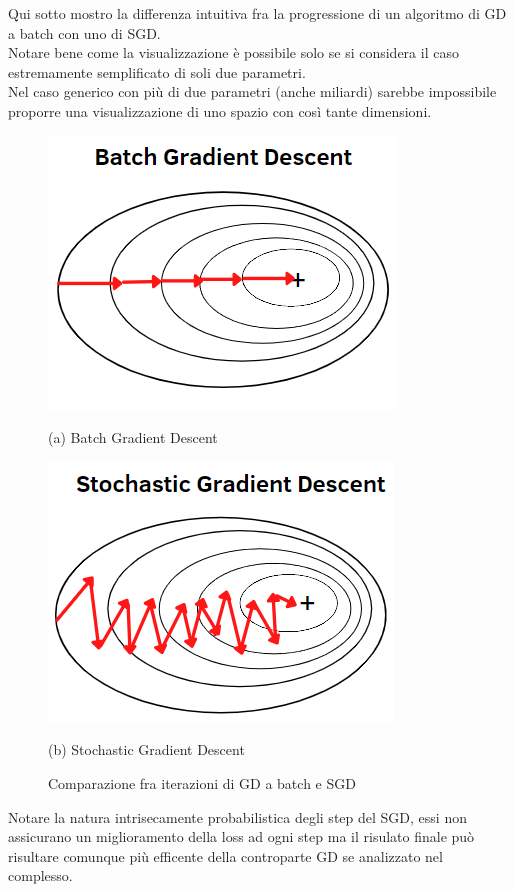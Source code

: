 \documentclass[12pt,a4paper,openright,twoside]{report}
\begin{document}
Qui sotto mostro la differenza intuitiva fra la progressione di un algoritmo di GD a batch con uno di SGD.\\
Notare bene come la visualizzazione è possibile solo se si considera il caso estremamente semplificato di soli due parametri. \\Nel caso generico con più di due parametri (anche miliardi) sarebbe impossibile proporre una visualizzazione di uno spazio con così tante dimensioni.
\begin{figure}[h]
\begin{minipage}[t]{0.49\linewidth}
\centering
\includegraphics[width=\linewidth]{batchGD.png}

(a) Batch Gradient Descent
\end{minipage}%
\hfill\vrule\hfill
\begin{minipage}[t]{0.49\linewidth}
\centering
\includegraphics[width=\linewidth]{SGD.png}

(b)  Stochastic Gradient Descent
\end{minipage}
\caption{Comparazione fra iterazioni di GD a batch e SGD }
\end{figure}
Notare la natura intrisecamente probabilistica degli step del SGD, essi non assicurano un miglioramento della loss ad ogni step ma il risulato finale può risultare comunque più efficente della controparte GD se analizzato nel complesso.
\newpage
\end{document}
